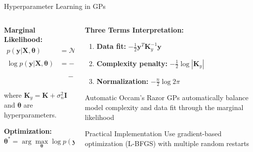 \documentclass[aspectratio=169,11pt]{beamer}
\newcommand{\Normal}{\mathcal{N}}
\begin{document}
\begin{frame}{Hyperparameter Learning in GPs}
\begin{columns}
\begin{column}{0.5\textwidth}
\textbf{Marginal Likelihood:}
\begin{align}
p(\mathbf{y}|\mathbf{X}, \boldsymbol{\theta}) &= \Normal(\mathbf{y}; \mathbf{0}, \mathbf{K} + \sigma_n^2 \mathbf{I})\\
\log p(\mathbf{y}|\mathbf{X}, \boldsymbol{\theta}) &= -\frac{1}{2}\mathbf{y}^T \mathbf{K}_y^{-1} \mathbf{y}\\
&\quad - \frac{1}{2}\log|\mathbf{K}_y| - \frac{n}{2}\log 2\pi
\end{align}

where $\mathbf{K}_y = \mathbf{K} + \sigma_n^2 \mathbf{I}$ and $\boldsymbol{\theta}$ are hyperparameters.

\textbf{Optimization:}
\[\boldsymbol{\theta}^* = \arg\max_{\boldsymbol{\theta}} \log p(\mathbf{y}|\mathbf{X}, \boldsymbol{\theta})\]
\end{column}
\begin{column}{0.5\textwidth}
\textbf{Three Terms Interpretation:}
\begin{enumerate}
\item \textbf{Data fit:} $-\frac{1}{2}\mathbf{y}^T \mathbf{K}_y^{-1} \mathbf{y}$
\item \textbf{Complexity penalty:} $-\frac{1}{2}\log|\mathbf{K}_y|$
\item \textbf{Normalization:} $-\frac{n}{2}\log 2\pi$
\end{enumerate}

\begin{block}{Automatic Occam's Razor}
GPs automatically balance model complexity and data fit through the marginal likelihood
\end{block}

\begin{alertblock}{Practical Implementation}
Use gradient-based optimization (L-BFGS) with multiple random restarts
\end{alertblock}
\end{column}
\end{columns}
\end{frame}
\end{document}
